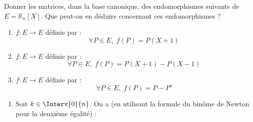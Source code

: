 \documentclass[a4paper,10pt]{report}
\begin{document}
\begin{Exa} Donner les matrices, dans la base canonique, des endomorphismes suivants de $E=\mathbb{R}_n[X]$. Que peut-on en déduire concernant ces endomorphismes ?

\begin{enumerate}
\item $f : E \rightarrow E$ définie par :
$$ \forall P \in E, \; f(P) = P(X+1) $$
\item $f : E \rightarrow E$ définie par :
$$ \forall P \in E, \; f(P) = P(X+1)-P(X-1) $$
\item $f : E \rightarrow E$ définie par :
$$ \forall P \in E, \; f(P) = P-P' $$
\end{enumerate}
\end{Exa} 

\begin{enumerate}
\item Soit $k \in \Interv{0}{n}$. On a (en utilisant la formule du binôme de Newton pour la deuxième égalité) : 


\end{enumerate}
\end{document}
